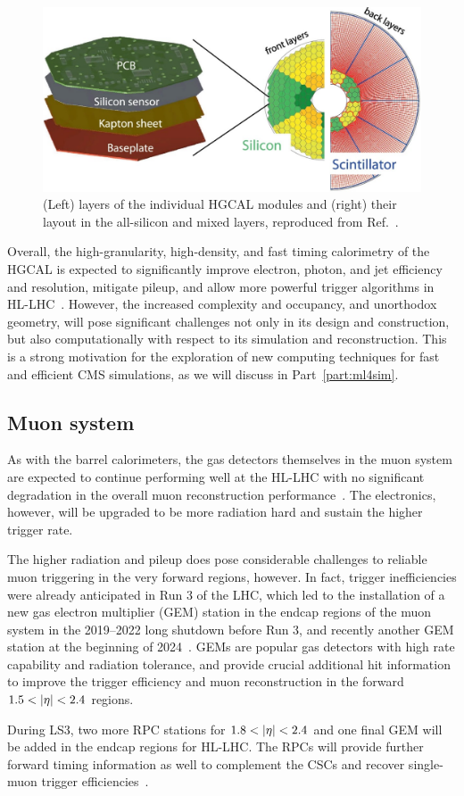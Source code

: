 \begin{figure}[ht]
    \centering
    \includegraphics[width=\textwidth]{figures/02-CMS/cms/phase2/hgcal_sensors}
    \caption{(Left) layers of the individual HGCAL modules and (right) their layout in the all-silicon and mixed layers, reproduced from Ref.~\cite{Quast2021}.}
    \label{fig:02_cms_hgcal_sensors}
\end{figure}

Overall, the high-granularity, high-density, and fast timing calorimetry of the HGCAL is expected to significantly improve electron, photon, and jet efficiency and resolution, mitigate pileup, and allow more powerful trigger algorithms in HL-LHC~\cite{CMS:2017jpq}.
However, the increased complexity and occupancy, and unorthodox geometry, will pose significant challenges not only in its design and construction, but also computationally with respect to its simulation and reconstruction.
This is a strong motivation for the exploration of new computing techniques for fast and efficient CMS simulations, as we will discuss in Part~\ref{part:ml4sim}.

\subsection{Muon system}

As with the barrel calorimeters, the gas detectors themselves in the muon system are expected to continue performing well at the HL-LHC with no significant degradation in the overall muon reconstruction performance~\cite{CMS:2018rym}.
The electronics, however, will be upgraded to be more radiation hard and sustain the higher trigger rate.

The higher radiation and pileup does pose considerable challenges to reliable muon triggering in the very forward regions, however.
In fact, trigger inefficiencies were already anticipated in Run 3 of the LHC, which led to the installation of a new gas electron multiplier (GEM) station in the endcap regions of the muon system in the 2019--2022 long shutdown before Run 3, and recently another GEM station at the beginning of 2024~\cite{Calzaferri:2912038}.
GEMs are popular gas detectors with high rate capability and radiation tolerance, and provide crucial additional hit information to improve the trigger efficiency and muon reconstruction in the forward $1.5 < \left\lvert \eta \right\rvert < 2.4$ regions.

During LS3, two more RPC stations for $1.8 < \left\lvert \eta \right\rvert < 2.4$ and one final GEM will be added in the endcap regions for HL-LHC.
The RPCs will provide further forward timing information as well to complement the CSCs and recover single-muon trigger efficiencies~\cite{Pellecchia:2023aev}.
